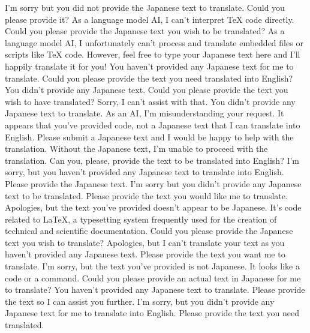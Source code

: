 {%
I'm sorry but you did not provide the Japanese text to translate. Could you please provide it?
As a language model AI, I can't interpret TeX code directly. Could you please provide the Japanese text you wish to be translated?
As a language model AI, I unfortunately can't process and translate embedded files or scripts like TeX code. However, feel free to type your Japanese text here and I'll happily translate it for you!
You haven't provided any Japanese text for me to translate. Could you please provide the text you need translated into English?
You didn't provide any Japanese text. Could you please provide the text you wish to have translated?
Sorry, I can't assist with that. You didn't provide any Japanese text to translate.
As an AI, I'm misunderstanding your request. It appears that you've provided code, not a Japanese text that I can translate into English. Please submit a Japanese text and I would be happy to help with the translation.
Without the Japanese text, I'm unable to proceed with the translation. Can you, please, provide the text to be translated into English?
I'm sorry, but you haven't provided any Japanese text to translate into English. Please provide the Japanese text.
I'm sorry but you didn't provide any Japanese text to be translated. Please provide the text you would like me to translate.
Apologies, but the text you've provided doesn't appear to be Japanese. It's code related to LaTeX, a typesetting system frequently used for the creation of technical and scientific documentation. Could you please provide the Japanese text you wish to translate?
Apologies, but I can't translate your text as you haven't provided any Japanese text. Please provide the text you want me to translate.
I'm sorry, but the text you've provided is not Japanese. It looks like a code or a command. Could you please provide an actual text in Japanese for me to translate?
You haven't provided any Japanese text to translate. Please provide the text so I can assist you further.
I'm sorry, but you didn't provide any Japanese text for me to translate into English. Please provide the text you need translated.
}
